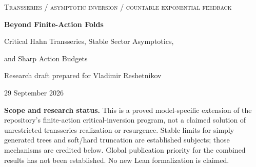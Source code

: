 \documentclass[11pt,a4paper]{article}
\numberwithin{equation}{section}
\theoremstyle{definition}
\theoremstyle{remark}
\begin{document}
\begin{center}
{\small\scshape Transseries / asymptotic inversion / countable exponential feedback}\par
\vspace{10pt}
{\LARGE\bfseries Beyond Finite-Action Folds}\par
\vspace{6pt}
{\Large Critical Hahn Transseries, Stable Sector Asymptotics,\par and Sharp Action Budgets}\par
\vspace{12pt}
{\normalsize Research draft prepared for Vladimir Reshetnikov}\par
{\small 29 September 2026}\par
\end{center}
\vspace{5pt}
\begin{abstract}
Finite analytic action families generically produce square-root inverse
singularities. A countable family can instead reach a nonanalytic boundary,
where that conclusion fails. We study the explicit positive class
\[
 U_\beta(q)=\beta\sum_{j\ge1}a_jq^j e^{jU_\beta(q)},\qquad
 a_j=a j^{-1-\alpha}\quad\hbox{outside a finite set},\quad 1<\alpha<2.
\]
At its critical coupling, we construct an actually convergent Hahn inverse
with a finite positive generating grid, give a closed formula for every
coefficient, and determine its exact finite-ramification criterion.
An all-orders, uniformly additive large-sector expansion has coefficients
expressed through derivatives of a stable density. A reflection identity
identifies its terms with the Hahn coefficients and explains a precise
arithmetic cancellation rule. We then prove a joint coupling--action-cutoff
limit. The number of retained actions must exceed the stable scale
$n^{1/\alpha}$ to preserve the $n$th coefficient asymptotically; at a
comparable cutoff an explicit infinitely divisible density gives the exact
limiting loss. Finally, we compute the critical-value and curvature drift
of the finite-action folds and prove a triangular-array Gaussian limit in
the complementary hard-cutoff regime. All statements include conventional
proofs. Exact coefficient checks and reproducible numerical diagnostics
accompany the article.
\end{abstract}
\noindent\textbf{Scope and research status.}
This is a proved model-specific extension of the repository's finite-action
critical-inversion program, not a claimed solution of unrestricted
transseries realization or resurgence. Stable limits for simply generated
trees and soft/hard truncation are established subjects; those mechanisms
are credited below. Global publication priority for the combined results
has not been established. No new Lean formalization is claimed.
\end{document}
